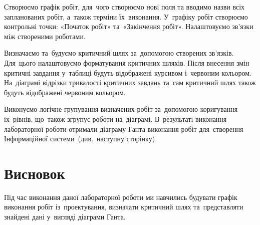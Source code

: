\documentclass[
	a4paper,
	oneside,
	BCOR = 10mm,
	DIV = 12,
	12pt,
	headings = normal,
]{scrartcl}
\begin{document}
		Створюємо графік робіт, для~чого створюємо нові поля та вводимо назви всіх запланованих робіт, а~також терміни їх~виконання. У~графіку робіт створюємо контрольні точки: «Початок робіт» та~«Закінчення робіт». Налаштовуємо зв'язки між створеними роботами.

		Визначаємо та~будуємо критичний шлях за~допомогою створених зв'язків. Для~цього налаштовуємо форматування критичних шляхів. Після внесення змін критичні завдання у~таблиці будуть відображені курсивом і~червоним кольором. На~діаграмі відрізки тривалості критичних завдань та~сам критичний шлях також будуть відображені червоним кольором.

		Виконуємо логічне групування визначених робіт за~допомогою коригування їх~рівнів, що~також згрупує роботи на~діаграмі. В~результаті виконання лабораторної роботи отримали діаграму Ганта виконання робіт для~створення Інформаційної системи~(див.~наступну сторінку).

	\section{Висновок}
		Під час виконання даної лабораторної роботи ми навчились будувати графік виконання робіт із~проектування, визначати критичний шлях та~представляти знайдені дані у~вигляді діаграми Ганта.

		\label{page:msproject-gant-diag}
		
\end{document}
